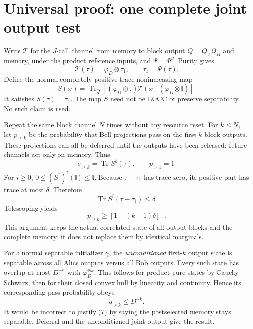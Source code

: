 \documentclass[11pt,a4paper]{article}
\newcommand{\tr}{\operatorname{Tr}}
\newcommand{\ph}{\varphi}
\newcommand{\I}{\mathbb I}
\begin{document}
\section{Universal proof: one complete joint output test}
Write \(\mathcal T\) for the \(J\)-call channel from memory to block output
\(Q=Q_AQ_B\) and memory, under the product reference inputs, and
\(\Psi=\Phi^J\). Purity gives
\[
 \mathcal T(\tau)=\ph_D\otimes\tau_1,\qquad
 \tau_1=\Psi(\tau).
\]
Define the normal completely positive trace-nonincreasing map
\[
 S(x)=\tr_Q[(\ph_D\otimes\I)\mathcal T(x)(\ph_D\otimes\I)].
\]
It satisfies \(S(\tau)=\tau_1\).
The map \(S\) need not be LOCC or preserve separability. No such claim is used.

Repeat the same block channel \(N\) times without any resource reset.
For \(k\le N\), let \(p_{\ge k}\) be the probability that Bell projections
pass on the first \(k\) block outputs. These projections can all be deferred
until the outputs have been released: future channels act only on memory.
Thus
\[
 p_{\ge k}=\tr S^k(\tau),\qquad p_{\ge1}=1.
\]
For \(i\ge0\), \(0\le(S^*)^i(\I)\le\I\). Because \(\tau-\tau_1\)
has trace zero, its positive part has trace at most \(\delta\). Therefore
\[
 \tr S^i(\tau-\tau_1)\le\delta.
\]
Telescoping yields
\[
 p_{\ge k}\ge[1-(k-1)\delta]_+.                              \tag{6}
\]
This argument keeps the actual correlated state of all output blocks and
the complete memory; it does not replace them by identical marginals.

For a normal separable initializer \(\gamma\), the \emph{unconditioned}
first-\(k\) output state is separable across all Alice outputs versus all Bob
outputs. Every such state has overlap at most \(D^{-k}\) with
\(\ph_D^{\otimes k}\). This follows for product pure states by
Cauchy--Schwarz, then for their closed convex hull by linearity and continuity.
Hence its corresponding pass probability obeys
\[
 q_{\ge k}\le D^{-k}.                                      \tag{7}
\]
It would be incorrect to justify (7) by saying the postselected memory
stays separable. Deferral and the unconditioned joint output give the result.
\end{document}

